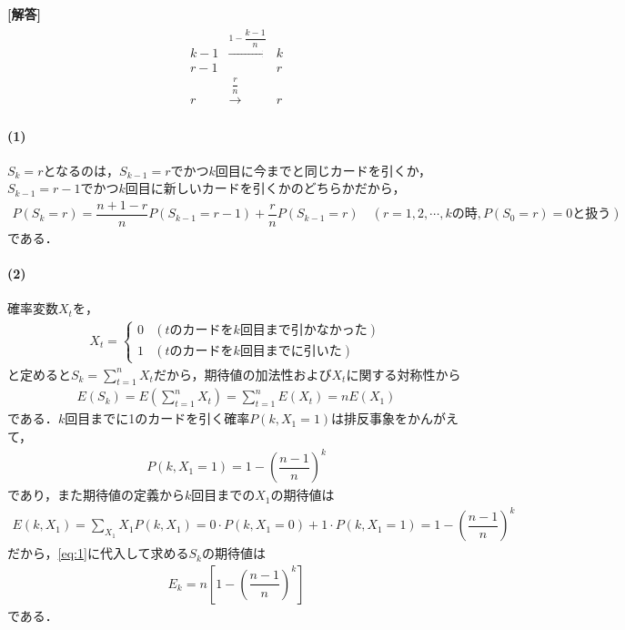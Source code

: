 \documentclass[../../main.tex]{subfiles}
\begin{document}
\begin{oframed}
  
\end{oframed}

{\bf [解答]}
\begin{align}
  \begin{array}{ccc}
    k-1 & \xrightarrow{1-\dfrac{k-1}{n}} & k \\
    r-1 & & r \\
    r & \xrightarrow{\dfrac{r}{n}} & r
  \end{array}
\end{align}

\paragraph{(1)}
$S_k=r$となるのは，$S_{k-1}=r$でかつ$k$回目に今までと同じカードを引くか，$S_{k-1}=r-1$でかつ$k$回目に新しいカードを引くかのどちらかだから，
\begin{align}
  P(S_k=r)=\dfrac{n+1-r}{n}P(S_{k-1}=r-1)+\dfrac{r}{n}P(S_{k-1}=r) \quad(r=1,2,\cdots,k\text{の時}, P(S_0=r)=0\text{と扱う})
\end{align}
である．

\paragraph{(2)}

確率変数$X_t$を，
\begin{align}
  X_t=
  \begin{cases}\displaystyle
    0 & (t\text{のカードを}k\text{回目まで引かなかった}) \\
    1 & (t\text{のカードを}k\text{回目までに引いた})
  \end{cases}
\end{align}
と定めると$S_k=\displaystyle\sum_{t=1}^nX_t$だから，期待値の加法性および$X_t$に関する対称性から
\begin{align}
  E(S_k)=E\left(\sum_{t=1}^nX_t\right)=\sum_{t=1}^nE(X_t)=nE(X_1) \label{eq:1}
\end{align}
である．$k$回目までに1のカードを引く確率$P(k, X_1=1)$は排反事象をかんがえて，
\begin{align}
  P(k, X_1=1)=1-\left(\dfrac{n-1}{n}\right)^k
\end{align}
であり，また期待値の定義から$k$回目までの$X_1$の期待値は
\begin{align}
  E(k, X_1)=\sum_{X_1}X_1 P(k,X_1) = 0\cdot P(k,X_1=0)+1\cdot P(k,X_1=1) = 1-\left(\dfrac{n-1}{n}\right)^k
\end{align}
だから，\cref{eq:1}に代入して求める$S_k$の期待値は
\begin{align}
  E_k=n\left[1-\left(\dfrac{n-1}{n}\right)^k\right]
\end{align}
である．
\end{document}
